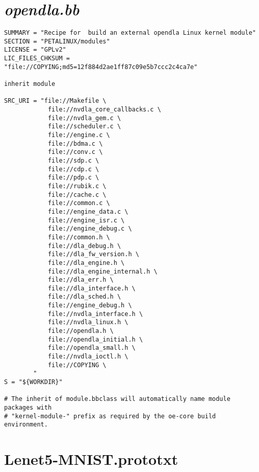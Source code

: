 \section{\emph{opendla.bb}}

\begin{lstlisting}
SUMMARY = "Recipe for  build an external opendla Linux kernel module"
SECTION = "PETALINUX/modules"
LICENSE = "GPLv2"
LIC_FILES_CHKSUM = "file://COPYING;md5=12f884d2ae1ff87c09e5b7ccc2c4ca7e"

inherit module

SRC_URI = "file://Makefile \
            file://nvdla_core_callbacks.c \
            file://nvdla_gem.c \
            file://scheduler.c \
            file://engine.c \
            file://bdma.c \
            file://conv.c \
            file://sdp.c \
            file://cdp.c \
            file://pdp.c \
            file://rubik.c \
            file://cache.c \
            file://common.c \
            file://engine_data.c \
            file://engine_isr.c \
            file://engine_debug.c \
            file://common.h \
            file://dla_debug.h \
            file://dla_fw_version.h \
            file://dla_engine.h \
            file://dla_engine_internal.h \
            file://dla_err.h \
            file://dla_interface.h \
            file://dla_sched.h \
            file://engine_debug.h \
            file://nvdla_interface.h \
            file://nvdla_linux.h \
            file://opendla.h \
            file://opendla_initial.h \
            file://opendla_small.h \
            file://nvdla_ioctl.h \
            file://COPYING \
        "
S = "${WORKDIR}"

# The inherit of module.bbclass will automatically name module packages with
# "kernel-module-" prefix as required by the oe-core build environment.
\end{lstlisting}

\section{Lenet5-MNIST.prototxt}

